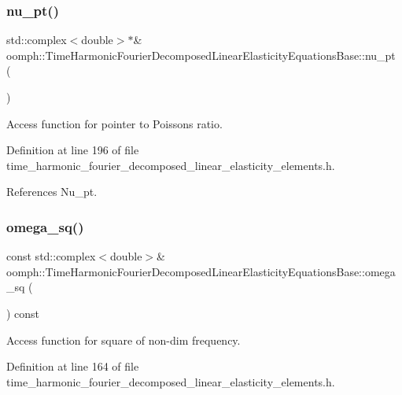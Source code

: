 \subsubsection{\texorpdfstring{nu\+\_\+pt()}{nu\_pt()}}
{\footnotesize\ttfamily std\+::complex$<$double$>$$\ast$\& oomph\+::\+Time\+Harmonic\+Fourier\+Decomposed\+Linear\+Elasticity\+Equations\+Base\+::nu\+\_\+pt (\begin{DoxyParamCaption}{ }\end{DoxyParamCaption})\hspace{0.3cm}{\ttfamily [inline]}}



Access function for pointer to Poisson\textquotesingle{}s ratio. 



Definition at line 196 of file time\+\_\+harmonic\+\_\+fourier\+\_\+decomposed\+\_\+linear\+\_\+elasticity\+\_\+elements.\+h.



References Nu\+\_\+pt.

\mbox{\label{classoomph_1_1TimeHarmonicFourierDecomposedLinearElasticityEquationsBase_af24d84d32f712a3005f4dd630b503676}} 
\subsubsection{\texorpdfstring{omega\+\_\+sq()}{omega\_sq()}}
{\footnotesize\ttfamily const std\+::complex$<$double$>$\& oomph\+::\+Time\+Harmonic\+Fourier\+Decomposed\+Linear\+Elasticity\+Equations\+Base\+::omega\+\_\+sq (\begin{DoxyParamCaption}{ }\end{DoxyParamCaption}) const\hspace{0.3cm}{\ttfamily [inline]}}



Access function for square of non-\/dim frequency. 



Definition at line 164 of file time\+\_\+harmonic\+\_\+fourier\+\_\+decomposed\+\_\+linear\+\_\+elasticity\+\_\+elements.\+h.



